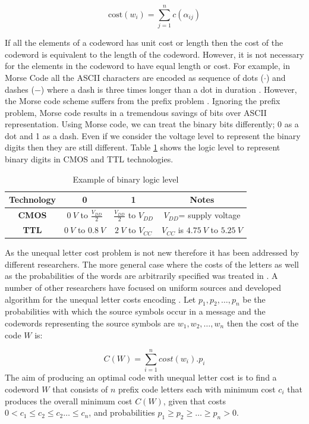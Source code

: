 \documentclass[preprint,12pt]{elsarticle}
\begin{document}
\begin{equation}
\label{eqn1}
  \text{cost}\left(w_i\right)=\sum_{j=1}^{n}c\left(\alpha_{ij}\right)
\end{equation} 
  
If all the elements of a codeword has unit cost or length then the cost of the codeword is equivalent to the length of the codeword. However, it is not necessary for the elements in the codeword to have equal length or cost. For example, in Morse Code all the ASCII characters are encoded as sequence of dots ($\cdot$) and dashes ($-$) where a dash is three times longer than a dot in duration \cite{Redmond09}. However, the Morse code scheme suffers from the prefix problem \cite{Gr03}. Ignoring the prefix problem, Morse code results in a tremendous savings of bits over ASCII representation. Using Morse code, we can treat the binary bits differently; 0 as a dot and 1 as a dash. Even if we consider the voltage level to represent the binary digits then they are still different. Table \ref{table1} shows the logic level to represent binary digits in CMOS and TTL technologies. 

\begin{table}[h]
\renewcommand{\arraystretch}{1.5}
\caption{Example of binary logic level}
\label{table1}
\centering
\begin{tabular}{c c c c}
\hline
 \bfseries Technology  & 0 & 1&Notes\\
\hline
\bfseries CMOS & $0~V$ to $\frac{V_{DD}}{2}$&$\frac{V_{DD}}{2}$ to $V_{DD}$&$V_{DD}$= supply voltage\\
\bfseries TTL & $0~V$ to $0.8~V$&$2~V$ to $V_{CC}$ &$V_{CC}$ is $4.75~V$ to $5.25~V$\\
\hline
\end{tabular}
\end{table}

As the unequal letter cost problem is not new therefore it has been addressed by different researchers. The more general case where the costs of the letters as well as the probabilities of the words are arbitrarily specified was treated in \cite{Karp61}. A number of other researchers have focused on uniform sources and developed algorithm for the unequal letter costs encoding \cite{Gil95, Kar62,Varn71,AltMel80,perl1975}.  Let $p_1,p_2,\ldots,p_n$ be the probabilities with which the source symbols occur in a message and the codewords representing the source symbols are $w_1,w_2,\ldots,w_n$ then the cost of the code $W$ is:

\begin{equation}
C\left(W\right)=\sum_{i=1}^{n}cost\left(w_i\right).p_i 
\end{equation}
The aim of producing an optimal code with unequal letter cost is to find a codeword $W$ that consists of $n$ prefix code letters each with minimum cost $c_i$ that produces the overall minimum cost $C\left(W\right)$, given that costs $0<c_1\leq c_2 \leq c_2 \ldots \leq c_n$, and probabilities $p_1\geq p_2\geq \ldots\geq p_n>0$.
\end{document}
